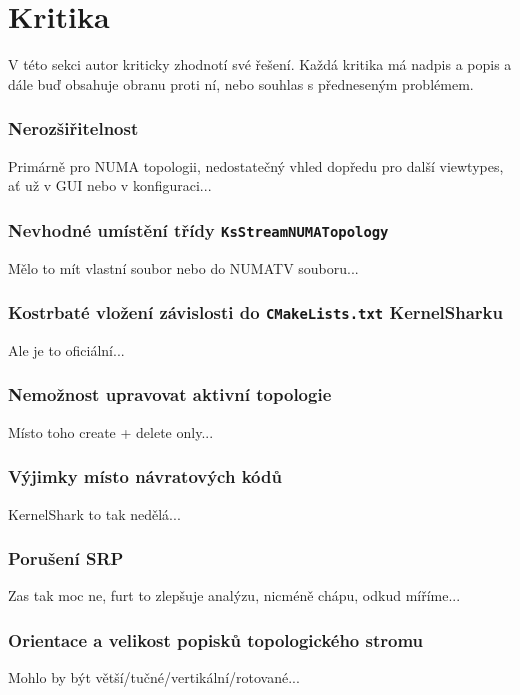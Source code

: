 \section{Kritika}
V této sekci autor kriticky zhodnotí své řešení. Každá kritika má nadpis a popis a dále buď obsahuje obranu proti ní, nebo souhlas s předneseným problémem.

\subsubsection*{Nerozšiřitelnost}
\label{nerozšiřitelnost}
Primárně pro NUMA topologii, nedostatečný vhled dopředu pro další viewtypes, ať už v GUI nebo v konfiguraci...

\subsubsection*{Nevhodné umístění třídy \texttt{KsStreamNUMATopology}}
Mělo to mít vlastní soubor nebo do NUMATV souboru...

\subsubsection*{Kostrbaté vložení závislosti do \texttt{CMakeLists.txt} KernelSharku}
Ale je to oficiální...

\subsubsection*{Nemožnost upravovat aktivní topologie}
Místo toho create + delete only...

\subsubsection*{Výjimky místo návratových kódů}
KernelShark to tak nedělá...

\subsubsection*{Porušení SRP}
Zas tak moc ne, furt to zlepšuje analýzu, nicméně chápu, odkud míříme...

\subsubsection*{Orientace a velikost popisků topologického stromu}
Mohlo by být větší/tučné/vertikální/rotované...

